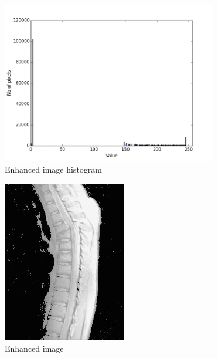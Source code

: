 \documentclass[10pt]{article}
\begin{document}
\begin{figure}[!ht]
	\centering
	\includegraphics[height=200pt]{./ex1/Fig1_enh_hist.png}
	\caption{Enhanced image histogram}
\end{figure}
\begin{figure}[!ht]
	\centering
	\includegraphics[height=200pt]{./ex1/Fig1_enh.jpg}
	\caption{Enhanced image}
\end{figure}
\clearpage
\end{document}
